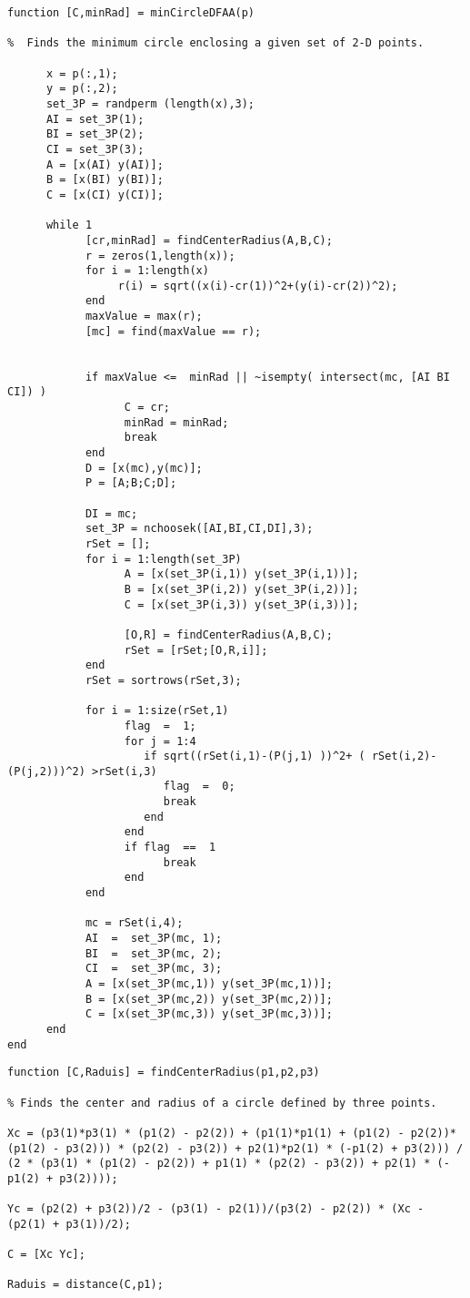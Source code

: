 \documentclass[a4paper, 12pt]{article}
\begin{document}
\begin{lstlisting}
function [C,minRad] = minCircleDFAA(p)

%  Finds the minimum circle enclosing a given set of 2-D points.

      x = p(:,1);
      y = p(:,2);
      set_3P = randperm (length(x),3);
      AI = set_3P(1);
      BI = set_3P(2);
      CI = set_3P(3);
      A = [x(AI) y(AI)];
      B = [x(BI) y(BI)];
      C = [x(CI) y(CI)];

      while 1
            [cr,minRad] = findCenterRadius(A,B,C);
            r = zeros(1,length(x));
            for i = 1:length(x)
                 r(i) = sqrt((x(i)-cr(1))^2+(y(i)-cr(2))^2);
            end
            maxValue = max(r);     
            [mc] = find(maxValue == r);
             

            if maxValue <=  minRad || ~isempty( intersect(mc, [AI BI CI]) )
                  C = cr;
                  minRad = minRad;
                  break                      
            end
            D = [x(mc),y(mc)];
            P = [A;B;C;D];
              
            DI = mc;
            set_3P = nchoosek([AI,BI,CI,DI],3);
            rSet = [];
            for i = 1:length(set_3P)
                  A = [x(set_3P(i,1)) y(set_3P(i,1))];
                  B = [x(set_3P(i,2)) y(set_3P(i,2))];
                  C = [x(set_3P(i,3)) y(set_3P(i,3))];
                   
                  [O,R] = findCenterRadius(A,B,C);
                  rSet = [rSet;[O,R,i]];
            end
            rSet = sortrows(rSet,3);
             
            for i = 1:size(rSet,1)
                  flag  =  1;
                  for j = 1:4
                     if sqrt((rSet(i,1)-(P(j,1) ))^2+ ( rSet(i,2)-(P(j,2)))^2) >rSet(i,3)
                        flag  =  0;  
                        break
                     end
                  end
                  if flag  ==  1      
                        break
                  end
            end
             
            mc = rSet(i,4);
            AI  =  set_3P(mc, 1);
            BI  =  set_3P(mc, 2);
            CI  =  set_3P(mc, 3);
            A = [x(set_3P(mc,1)) y(set_3P(mc,1))];
            B = [x(set_3P(mc,2)) y(set_3P(mc,2))];
            C = [x(set_3P(mc,3)) y(set_3P(mc,3))];
      end
end
\end{lstlisting}

\begin{lstlisting}
function [C,Raduis] = findCenterRadius(p1,p2,p3)

% Finds the center and radius of a circle defined by three points.

Xc = (p3(1)*p3(1) * (p1(2) - p2(2)) + (p1(1)*p1(1) + (p1(2) - p2(2))*(p1(2) - p3(2))) * (p2(2) - p3(2)) + p2(1)*p2(1) * (-p1(2) + p3(2))) / (2 * (p3(1) * (p1(2) - p2(2)) + p1(1) * (p2(2) - p3(2)) + p2(1) * (-p1(2) + p3(2))));

Yc = (p2(2) + p3(2))/2 - (p3(1) - p2(1))/(p3(2) - p2(2)) * (Xc - (p2(1) + p3(1))/2);

C = [Xc Yc];

Raduis = distance(C,p1); 
\end{lstlisting}
\end{document}
